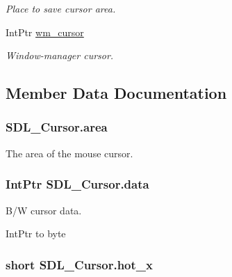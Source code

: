 \begin{DoxyCompactItemize}
\begin{DoxyCompactList}\small\item\em Place to save cursor area. \item\end{DoxyCompactList}\item 
IntPtr \hyperlink{struct_s_d_l___cursor_ab57675a1865a273bef376f8697538414}{wm\_\-cursor}
\begin{DoxyCompactList}\small\item\em Window-\/manager cursor. \item\end{DoxyCompactList}\end{DoxyCompactItemize}


\subsection{Member Data Documentation}
\hypertarget{struct_s_d_l___cursor_add087ac0357936f5813576dd166c0148}{
\subsubsection[{area}]{ {\bf SDL\_\-Cursor.area}}}
\label{struct_s_d_l___cursor_add087ac0357936f5813576dd166c0148}


The area of the mouse cursor. 

\hypertarget{struct_s_d_l___cursor_a82d5b4f27b72629e06311bce52dd8ba4}{
\subsubsection[{data}]{\setlength{\rightskip}{0pt plus 5cm}IntPtr {\bf SDL\_\-Cursor.data}}}
\label{struct_s_d_l___cursor_a82d5b4f27b72629e06311bce52dd8ba4}


B/W cursor data. 

IntPtr to byte \hypertarget{struct_s_d_l___cursor_a256529b816278645f0be40eb801b9b2d}{
\subsubsection[{hot\_\-x}]{\setlength{\rightskip}{0pt plus 5cm}short {\bf SDL\_\-Cursor.hot\_\-x}}}
\label{struct_s_d_l___cursor_a256529b816278645f0be40eb801b9b2d}


